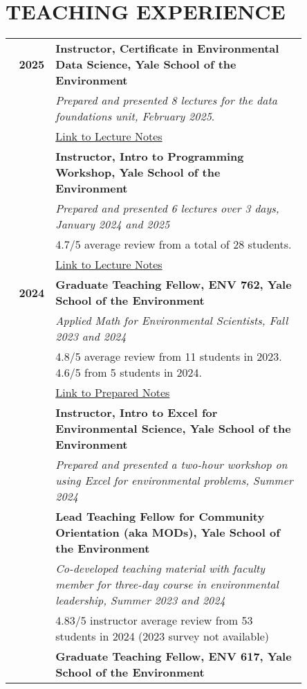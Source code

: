 \documentclass[11pt]{article}
\begin{document}
\section*{TEACHING EXPERIENCE}
\begin{longtable}{>{\bfseries}r p{0.85\linewidth}} %
2025 & \textbf{Instructor, Certificate in Environmental Data Science, Yale School of the Environment} \\
    & \textit{Prepared and presented 8 lectures for the data foundations unit, February 2025}.\\ 
    & \href{https://github.com/a5creel/yse_data_science_certificate}{Link to Lecture Notes} \\[1ex]
    \clearpage
    & \textbf{Instructor, Intro to Programming Workshop, Yale School of the Environment} \\
    & \textit{Prepared and presented 6 lectures over 3 days, January 2024 and 2025} \\
    & 4.7/5 average review from a total of 28 students.\\
    &  \href{https://github.com/a5creel/intro_to_programming}{Link to Lecture Notes}  \\[1ex]
2024 & \textbf{Graduate Teaching Fellow, ENV 762, Yale School of the Environment} \\
    & \textit{Applied Math for Environmental Scientists, Fall 2023 and 2024} \\
    & 4.8/5 average review from 11 students in 2023. 4.6/5 from 5 students in 2024. \\
    & \href{https://github.com/a5creel/AMES}{Link to Prepared Notes} \\[1ex]    
    & \textbf{Instructor, Intro to Excel for Environmental Science, Yale School of the Environment} \\
    & \textit{Prepared and presented a two-hour workshop on using Excel for environmental problems, Summer 2024} \\[1ex]
    & \textbf{Lead Teaching Fellow for Community Orientation (aka MODs), Yale School of the Environment} \\
    & \textit{Co-developed teaching material with faculty member for three-day course in environmental leadership, Summer 2023 and 2024} \\
    & 4.83/5 instructor average review from 53 students in 2024 (2023 survey not available) \\[1ex]
    & \textbf{Graduate Teaching Fellow, ENV 617, Yale School of the Environment} \\

\end{longtable}
\end{document}
